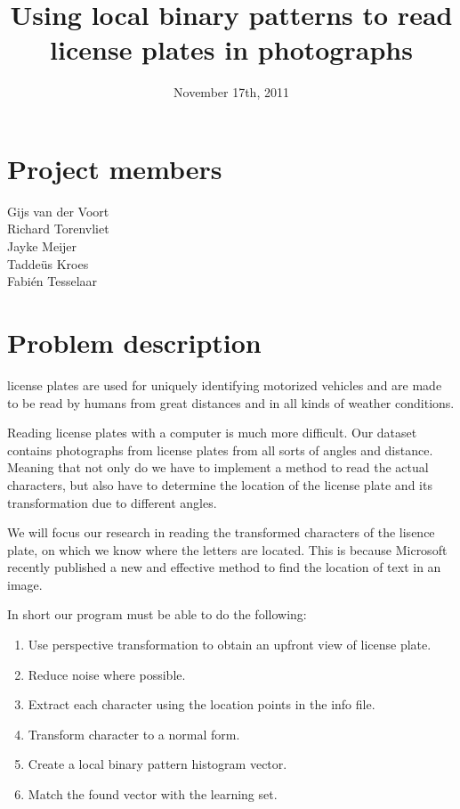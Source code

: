 \documentclass[a4paper]{article}
\title{Using local binary patterns to read license plates in photographs}
\date{November 17th, 2011}
\begin{document}
\maketitle

\section*{Project members}
Gijs van der Voort\\
Richard Torenvliet\\
Jayke Meijer\\
Tadde\"us Kroes\\
Fabi\'en Tesselaar

\tableofcontents
\setcounter{secnumdepth}{1}

\section{Problem description}

license plates are used for uniquely identifying motorized vehicles and are 
made to be read by humans from great distances and in all kinds of weather 
conditions.

Reading license plates with a computer is much more difficult. Our dataset
contains photographs from license plates from all sorts of angles and distance. 
Meaning that not only do we have to implement a method to read the actual 
characters, but also have to determine the location of the license plate and its
transformation due to different angles.

We will focus our research in reading the transformed characters of the 
lisence plate, on which we know where the letters are located. This is because
Microsoft recently published a new and effective method to find the location of 
text in an image.

In short our program must be able to do the following:

\begin{enumerate}
\item Use perspective transformation to obtain an upfront view of license plate.
\item Reduce noise where possible.
\item Extract each character using the location points in the info file.
\item Transform character to a normal form. 
\item Create a local binary pattern histogram vector.
\item Match the found vector with the learning set.
\end{enumerate}
\end{document}

